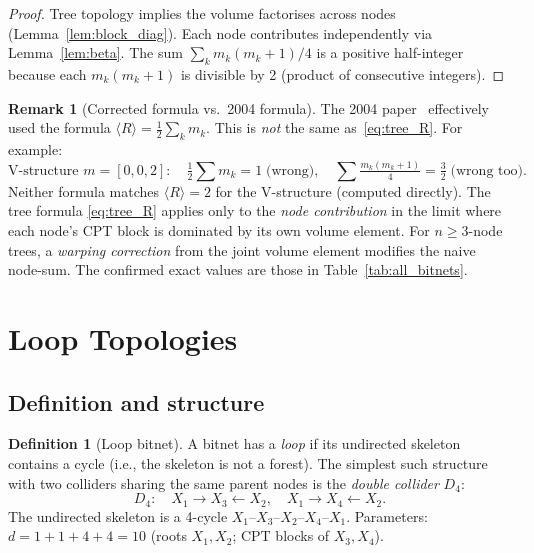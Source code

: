 \documentclass[11pt]{article}
\theoremstyle{definition}
\newtheorem{definition}[theorem]{Definition}
\newtheorem{remark}[theorem]{Remark}
\begin{document}
\begin{proof}
Tree topology implies the volume factorises across nodes 
(Lemma~\ref{lem:block_diag}).  Each node contributes independently 
via Lemma~\ref{lem:beta}.  The sum $\sum_k m_k(m_k+1)/4$ is a positive 
half-integer because each $m_k(m_k+1)$ is divisible by 2 
(product of consecutive integers).
\end{proof}

\begin{remark}[Corrected formula vs.\ 2004 formula]
\label{rem:formula_correction}
The 2004 paper~\cite{Rod04} effectively used the formula $\langle R\rangle = 
\tfrac{1}{2}\sum_k m_k$.  This is \emph{not} the same as~\eqref{eq:tree_R}.  
For example:
\[
\text{V-structure } m=[0,0,2]: \quad 
\tfrac{1}{2}\sum m_k = 1 \;\text{(wrong)}, \quad 
\sum\tfrac{m_k(m_k+1)}{4} = \tfrac{3}{2} \;\text{(wrong too).}
\]
Neither formula matches $\langle R\rangle = 2$ for the V-structure 
(computed directly).  The tree formula \eqref{eq:tree_R} applies only to 
the \emph{node contribution} in the limit where each node's CPT block 
is dominated by its own volume element.  
For $n \geq 3$-node trees, a \emph{warping correction} from the 
joint volume element modifies the naive node-sum.  The confirmed exact 
values are those in Table~\ref{tab:all_bitnets}.
\end{remark}

\section{Loop Topologies}\label{sec:loops}

\subsection{Definition and structure}

\begin{definition}[Loop bitnet]
A bitnet has a \emph{loop} if its undirected skeleton contains a cycle 
(i.e., the skeleton is not a forest).  The simplest such structure with 
two colliders sharing the same parent nodes is the \emph{double collider} 
$D_4$:
\[
  D_4: \quad X_1 \to X_3 \leftarrow X_2, \quad X_1 \to X_4 \leftarrow X_2.
\]
The undirected skeleton is a 4-cycle $X_1$--$X_3$--$X_2$--$X_4$--$X_1$.  
Parameters: $d = 1 + 1 + 4 + 4 = 10$ (roots $X_1,X_2$; CPT blocks of $X_3,X_4$).
\end{definition}
\end{document}
